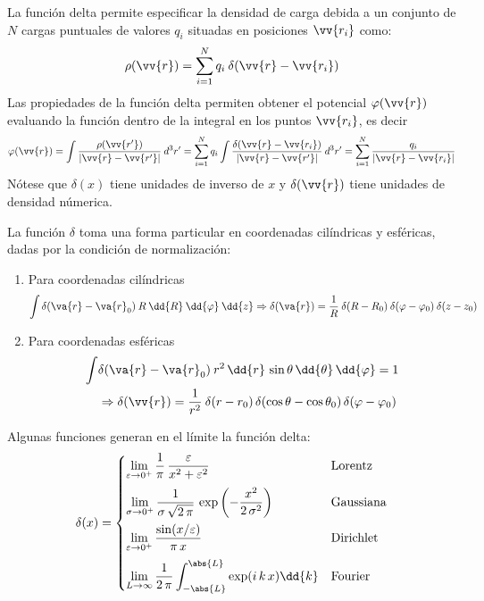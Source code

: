 La función delta permite especificar la densidad de
carga debida a un conjunto de $N$ cargas puntuales de valores $q_{i}$ situadas en posiciones $\vv{r_{i}}$  como:
\begin{equation}
\rho (\vv{r}) = \sum_{i=1}^{N} q_{i} \: \delta(\vv{r} - \vv{r_{i}})
\label{eq:ecuacion_A_04}
\end{equation}
Las propiedades de la función delta permiten obtener el potencial $\varphi(\vv{r})$ evaluando la función dentro de la integral en los puntos $\vv{r_{i}}$, es decir
\begin{equation}
\varphi(\vv{r}) = \int \dfrac{\rho(\vv{r^{\prime}})}{\vert \vv{r} - \vv{r^{\prime}} \vert} \: d^{3}r^{\prime} = \sum_{i=1}^{N} q_{i} \int \dfrac{\delta ( \vv{r} - \vv{r_{i}})}{\vert \vv{r} - \vv{r^{\prime}} \vert} \: d^{3}r^{\prime} = \sum_{i=1}^{N} \dfrac{q_{i}}{\vert \vv{r} - \vv{r_{i}} \vert}
\label{eq:ecuacion_A_05}
\end{equation}
Nótese que $\delta (x)$ tiene unidades de inverso de $x$ y $\delta (\vv{r})$ tiene unidades de densidad númerica.
\par
La función $\delta$ toma una forma particular en coordenadas cilíndricas y esféricas, dadas por la condición de normalización:
\begin{enumerate}
\item Para coordenadas cilíndricas
\begin{equation}
\int \delta (\va{r} - \va{r}_{0}) \: R \: \dd{R} \: \dd{\varphi} \: \dd{z} \Rightarrow \delta (\va{r}) =  \dfrac{1}{R} \: \delta (R - R_{0}) \: \delta (\varphi - \varphi_{0}) \: \delta (z - z_{0})
\end{equation}
\item  Para coordenadas esféricas
\begin{equation}
\begin{aligned}
\int & \delta (\va{r} - \va{r}_{0}) \: r^{2} \, \dd{r} \, \sin \theta \, \dd{\theta} \, \dd{\varphi} = 1 \\
&\Rightarrow \delta (\vv{r}) = \dfrac{1}{r^{2}} \: \delta (r - r_{0}) \, \delta (\cos \theta - \cos \theta_{0}) \, \delta (\varphi - \varphi_{0})
\end{aligned}
\end{equation}
\end{enumerate}
Algunas funciones generan en el límite la función delta:
\begin{align*}
\delta(x) = \begin{cases}
\displaystyle
\lim_{\varepsilon \to 0^{+}} \dfrac{1}{\pi} \, \dfrac{\varepsilon}{x^{2} + \varepsilon^{2}} & \mbox{Lorentz} \\[1em]
\displaystyle
\lim_{\sigma \to 0^{+}} \dfrac{1}{\sigma \, \sqrt{2 \, \pi}} \, \exp \left( - \dfrac{x^{2}}{2 \, \sigma^{2}} \right) & \mbox{Gaussiana} \\[1em]
\displaystyle \lim_{\varepsilon \to 0^{+}} \dfrac{\sin(x / \varepsilon)}{ \pi \, x} & \mbox{Dirichlet} \\[1em]
\displaystyle \lim_{L \to \infty} \dfrac{1}{2 \, \pi} \int_{- \abs{L}}^{\abs{L}} \exp(i \, k \, x) \dd{k} & \mbox{Fourier}
\end{cases}
\end{align*}
